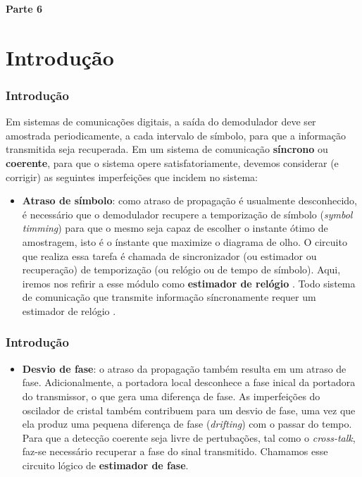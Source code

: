 
\begin{frame}
	\begin{block}{\centering\large\bfseries Parte 6}
		\centering\large\insertpart
	\end{block}
\end{frame}

\section{Introdução}
\begin{frame}[t]
	\frametitle{Introdução}
	
	Em sistemas de comunicações digitais, a saída do demodulador deve ser amostrada periodicamente, a cada intervalo de símbolo, para que a informação transmitida seja recuperada. Em um sistema de comunicação \textbf{síncrono} ou \textbf{coerente}, para que o sistema opere satisfatoriamente, devemos considerar (e corrigir) as seguintes imperfeições que incidem no sistema:
    \begin{itemize}
        \item \textbf{Atraso de símbolo}: como atraso de propagação é usualmente desconhecido, é necessário que o demodulador recupere a temporização de símbolo (\textit{symbol timming}) para que o mesmo seja capaz de escolher o instante ótimo de amostragem, isto é o ínstante que maximize o diagrama de olho. O circuito que realiza essa tarefa é chamada de sincronizador (ou estimador ou recuperação) de temporização (ou relógio ou de tempo de símbolo). Aqui, iremos nos refirir a esse módulo como \textbf{estimador de relógio} \cite{abrantes2010recuperaccao}. Todo sistema de comunicação que transmite informação síncronamente requer um estimador de relógio \cite{mengali2013synchronization}.  %
    \end{itemize}
\end{frame}

\begin{frame}[t]
	\frametitle{Introdução}
    \begin{itemize}
        \item \textbf{Desvio de fase}: o atraso da propagação também resulta em um atraso de fase. Adicionalmente, a portadora local desconhece a fase inical da portadora do transmissor, o que gera uma diferença de fase. As imperfeições do oscilador de cristal também contribuem para um desvio de fase, uma vez que ela produz uma pequena diferença de fase (\textit{drifting}) com o passar do tempo. Para que a detecção coerente seja livre de pertubações, tal como o \textit{cross-talk}, faz-se necessário recuperar a fase do sinal transmitido. Chamamos esse circuito lógico de \textbf{estimador de fase}. %
    \end{itemize}
\end{frame}

